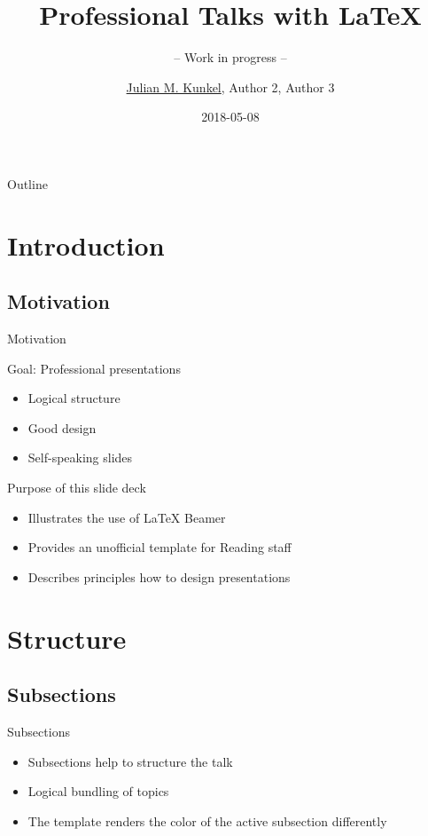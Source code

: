 \documentclass[compress,aspectratio=169]{beamer}
\title{Professional Talks with LaTeX}
\subtitle{-- Work in progress -- }
\author{\underline{Julian M. Kunkel}, Author 2, Author 3} %
\institute{Computer Science Department}
\date{2018-05-08}
\begin{document}
\begin{frame}[plain]
	\titlepage
\end{frame}

\begin{frame}{Outline}
	\tableofcontents[subsectionstyle=hide/hide]
\end{frame}


\section{Introduction}

\subsection{Motivation}
\begin{frame}{Motivation}
	\begin{block}{Goal: Professional presentations}
		\begin{itemize}
				\item Logical structure
				\item Good design
				\item Self-speaking slides
		\end{itemize}
	\end{block}

	\begin{block}{Purpose of this slide deck}
		\begin{itemize}
			\item Illustrates the use of LaTeX Beamer
			\item Provides an unofficial template for Reading staff
			\item Describes principles how to design presentations
		\end{itemize}
	\end{block}
\end{frame}

\section{Structure}
\sectionIntro

\subsection{Subsections}
\begin{frame}{Subsections}
\begin{itemize}
	\item Subsections help to structure the talk
	\item Logical bundling of topics
	\item The template renders the color of the active subsection differently
\end{itemize}
\end{frame}
\end{document}
